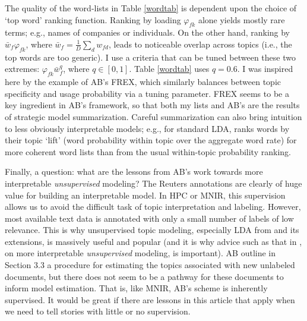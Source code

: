 \documentclass[12pt]{article}
\begin{document}
The quality of the word-lists in Table \ref{wordtab} is dependent upon the choice of `top word' ranking function.  Ranking by loading $\varphi_{fk}$ alone  yields mostly rare terms; e.g., names of companies or individuals.  On the other hand, ranking by ${\bar w}_f\varphi_{fk}$, where ${\bar w}_f = \tfrac{1}{D}\sum_d w_{fd}$, leads to noticeable overlap across topics (i.e., the top words are too generic).  I use a criteria that can be tuned between these two extremes: $\varphi_{fk}{\bar w}_f^q$, where $q \in [0,1]$.  Table \ref{wordtab} uses $q=0.6$. I was inspired here by the example of AB's FREX, which similarly balances between topic specificity and usage probability via a tuning parameter.  FREX seems to be a key ingredient in AB's framework, so that both my lists and AB's  are the results of  strategic model summarization.   Careful summarization can also bring intuition to less obviously interpretable models; e.g., for standard LDA, \cite{taddy_estimation_2012}  ranks words by their topic `lift' (word probability within topic over the aggregate word rate) for more coherent word lists than from the usual within-topic probability ranking.

Finally, a question: what are the lessons from AB's work
towards more interpretable {\it unsupervised} modeling? The Reuters
annotations are clearly of huge value for building an interpretable model.
In HPC or MNIR,  this supervision allows us to avoid the
difficult task of topic interpretation and labeling.  However, most available
text data is annotated with only a small number of labels of low relevance.
This is why unsupervised topic modeling, especially  LDA from
\cite{blei_latent_2003} and its extensions, is massively useful and popular (and it is why advice such as that in \citealt{wallach_rethinking_2009}, on more interpretable {\it unsupervised} modeling, is important). AB
outline in Section 3.3 a procedure for estimating the topics associated with
new  unlabeled documents, but there does not seem to be a pathway for these
documents to inform model estimation.  That is, like MNIR, AB's
scheme is inherently supervised.  It would be great if there are lessons in
this article that apply when we need to tell stories with little or no supervision.

\small


\end{document}
